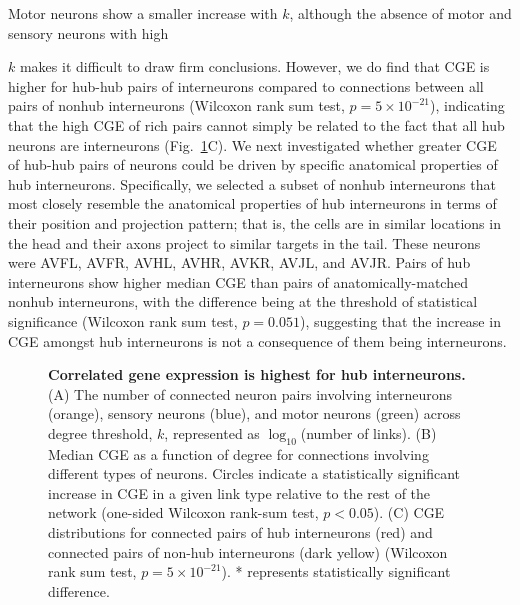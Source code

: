 \documentclass[10pt,letterpaper]{article}
\begin{document}
Motor neurons show a smaller increase with $k$, although the absence of motor and sensory neurons with high {$k$ makes it difficult to draw firm conclusions.
However, we do find that CGE is higher for hub-hub pairs of interneurons compared to connections between all pairs of nonhub interneurons (Wilcoxon rank sum test, $p = 5 \times 10^{-21}$), indicating that the high CGE of rich pairs cannot simply be \color{black} related to \color{black}the fact that all hub neurons are interneurons (Fig.~\ref{fig:Fig7}C).
We next investigated whether greater CGE of hub-hub pairs of neurons could be driven by specific anatomical properties of hub interneurons.
Specifically, we selected a subset of nonhub interneurons that most closely resemble the anatomical properties of hub interneurons in terms of their position and projection pattern; that is, the cells are in similar locations in the head and their axons project to similar targets in the tail. These neurons were AVFL, AVFR, AVHL, AVHR, AVKR, AVJL, and AVJR.
Pairs of hub interneurons show higher median CGE than pairs of anatomically-matched nonhub interneurons, with the difference being at the threshold of statistical significance (Wilcoxon rank sum test, $p = 0.051$), suggesting that the increase in CGE amongst hub interneurons \color{teal} is not a consequence of \color{black} them being interneurons.

\begin{figure}[h]
\centering
 \caption{
\textbf{Correlated gene expression is highest for hub interneurons.}
(A) The number of connected neuron pairs involving interneurons (orange), sensory neurons (blue), and motor neurons (green) across degree threshold, $k$, represented as $\log_{10}$(number of links).
(B) Median CGE as a function of degree for connections involving different types of neurons.
Circles indicate a statistically significant increase in CGE in a given link type relative to the rest of the network (one-sided Wilcoxon rank-sum test, $p < 0.05$).
(C) CGE distributions for connected pairs of hub interneurons (red) and connected pairs of non-hub interneurons (dark yellow) (Wilcoxon rank sum test, $p = 5 \times 10^{-21}$). * represents statistically significant difference.
}
 \label{fig:Fig7}
\end{figure}

}
\end{document}
